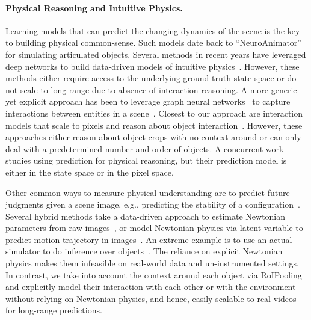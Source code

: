 \documentclass{article} \usepackage{iclr2021_conference,times}
\begin{document}
\paragraph{Physical Reasoning and Intuitive Physics.}
Learning models that can predict the changing dynamics of the scene is the key to building physical common-sense. Such models date back to ``NeuroAnimator''~\citep{grzeszczuk1998neuroanimator} for simulating articulated objects. Several methods in recent years have leveraged deep networks to build data-driven models of intuitive physics~\citep{bhattacharyya2016long,ehrhardt2017learning,fragkiadaki2015learning,chang2016compositional,stewart2017label}. However, these methods either require access to the underlying ground-truth state-space or do not scale to long-range due to absence of interaction reasoning.
A more generic yet explicit approach has been to leverage graph neural networks~\citep{scarselli2009graph} to capture interactions between entities in a scene~\citep{battaglia2018relational,chang2016compositional}.
Closest to our approach are interaction models that scale to pixels and reason about object interaction~\citep{watters2017visual,ye2019cvp}. However, these approaches either reason about object crops with no context around or can only deal with a predetermined number and order of objects. A concurrent work~\citep{girdhar2020forward} studies using prediction for physical reasoning, but their prediction model is either in the state space or in the pixel space.

Other common ways to measure physical understanding are to predict future judgments given a scene image, e.g., predicting the stability of a configuration~\citep{groth2018shapestacks,jia20153d,lerer2016learning,li2016fall,li2016visual}. Several hybrid methods take a data-driven approach to estimate Newtonian parameters from raw images~\citep{brubaker2009estimating,wu2016physics,bhat2002computing,wu2015galileo}, or model Newtonian physics via latent variable to predict motion trajectory in images~\citep{mottaghi2016newtonian,mottaghi2016happens,ye2018interpretable}. An extreme example is to use an actual simulator to do inference over objects~\citep{hamrick2011internal}. The reliance on explicit Newtonian physics makes them infeasible on real-world data and un-instrumented settings. In contrast, we take into account the context around each object via RoIPooling and explicitly model their interaction with each other or with the environment without relying on Newtonian physics, and hence, easily scalable to real videos for long-range predictions.
\end{document}
